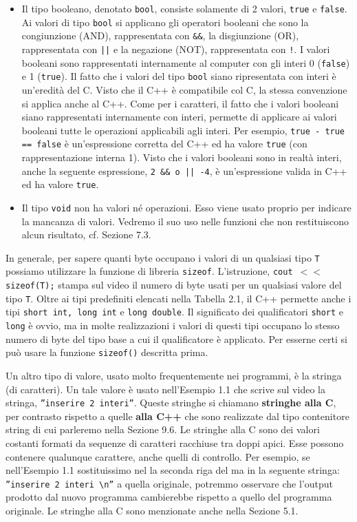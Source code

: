\begin{itemize}
\item
Il tipo booleano, denotato \texttt{bool}, consiste solamente di 2 valori, \texttt{true} e \texttt{false}.
Ai valori di tipo \texttt{bool} si applicano gli operatori booleani che sono la congiunzione (AND), rappresentata con \texttt{\&\&}, la disgiunzione (OR), rappresentata con \texttt{||} e la negazione (NOT), rappresentata con \texttt{!}.
I valori booleani sono rappresentati internamente al computer con gli interi 0 (\texttt{false}) e 1 (\texttt{true}). 
Il fatto che i valori del tipo \texttt{bool} siano ripresentata con interi è un'eredità del C.
Visto che il C++ è compatibile col C, la stessa convenzione si applica anche al C++.
Come per i caratteri, il fatto che i valori booleani siano rappresentati internamente con interi, permette di applicare ai valori booleani tutte le operazioni applicabili agli interi.
Per esempio, \texttt{true - true == false} è un'espressione corretta del C++ ed ha valore \texttt{true} (con rappresentazione interna 1).
Visto che i valori booleani sono in realtà interi, anche la seguente espressione, \texttt{2 \&\& o \texttt{||} -4}, è un'espressione valida in C++ ed ha valore \texttt{true}.

\item
Il tipo \texttt{void} non ha valori né operazioni.
Esso viene usato proprio per indicare la mancanza di valori.
Vedremo il suo uso nelle funzioni che non restituiscono alcun risultato, cf. Sezione 7.3.

\end{itemize}

In generale, per sapere quanti byte occupano i valori di un qualsiasi tipo \texttt{T} possiamo utilizzare la funzione di libreria \texttt{sizeof}.
L'istruzione, \texttt{cout $<<$ sizeof(T);} stampa sul video il numero di byte usati per un qualsiasi valore del tipo \texttt{T}.
Oltre ai tipi predefiniti elencati nella Tabella 2.1, il C++ permette anche i tipi \texttt{short int, long int} e \texttt{long double}.
Il significato dei qualificatori \texttt{short} e \texttt{long} è ovvio, ma in molte realizzazioni i valori di questi tipi occupano lo stesso numero di byte del tipo base a cui il qualificatore è applicato.
Per esserne certi si può usare la funzione \texttt{sizeof()} descritta prima. 

Un altro tipo di valore, usato molto frequentemente nei programmi, è la stringa (di caratteri). Un tale valore è usato nell'Esempio 1.1 che scrive sul video la stringa, \texttt{''inserire 2 interi''}.
Queste stringhe si chiamano \textbf{stringhe alla C}, per contrasto rispetto a quelle \textbf{alla C++} che sono realizzate dal tipo contenitore string di cui parleremo nella Sezione 9.6.
Le stringhe alla C sono dei valori costanti formati da sequenze di caratteri racchiuse tra doppi apici.
Esse possono contenere qualunque carattere, anche quelli di controllo.
Per esempio, se nell'Esempio 1.1 sostituissimo nel la seconda riga del ma in la seguente stringa: \texttt{''inserire 2 interi \textbackslash n''} a quella originale, potremmo osservare che l'output prodotto dal nuovo programma cambierebbe rispetto a quello del programma originale.
Le stringhe alla C sono menzionate anche nella Sezione 5.1. 

